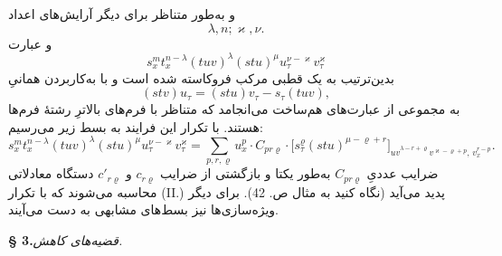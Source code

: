\documentclass[11pt]{article}
\begin{document}
و به‌طور متناظر برای دیگر آرایش‌های اعداد
\[\lambda,n;\varkappa,\nu.\]
و عبارت
\[s_x^m t_x^{n-\lambda}(tuv)^\lambda(stu)^\mu u_\tau^{\nu-\varkappa}v_\tau^\varkappa\]
بدین‌ترتیب به یک قطبی مرکب فروکاسته شده است و با به‌کاربردن همانیِ
\[
(stv)u_\tau=(stu)v_\tau-s_\tau(tuv),
\]
به مجموعی از عبارت‌های هم‌ساخت می‌انجامد که متناظر با فرم‌های بالاترِ رشتهٔ فرم‌ها هستند.
با تکرار این فرایند به بسط زیر می‌رسیم:
\[
\tag{III}
s_x^m t_x^{n-\lambda}(tuv)^\lambda(stu)^\mu u_\tau^{\nu-\varkappa}v_\tau^\varkappa
=
\sum_{p,r,\varrho}u_x^p\cdot C_{pr\varrho}\cdot
\bigl[s_\tau^\varrho(stu)^{\mu-\varrho+r}\bigr]_{\widehat{uv}^{\lambda-r+\varrho}v^{\varkappa-\varrho+p},\,v_x^{r-p}}.
\]
ضرایب عددیِ $C_{pr\varrho}$ به‌طور یکتا و بازگشتی از ضرایب $c_{r\varrho}$ و $c'_{r\varrho}$ دستگاه معادلاتی محاسبه می‌شوند که با تکرار (II.) پدید می‌آید (نگاه کنید به مثال ص. 42). برای دیگر ویژه‌سازی‌ها نیز بسط‌های مشابهی به دست می‌آیند.
\begin{center}
\textbf{§ 3.}\quad \emph{قضیه‌های کاهش.}
\end{center}
\end{document}

